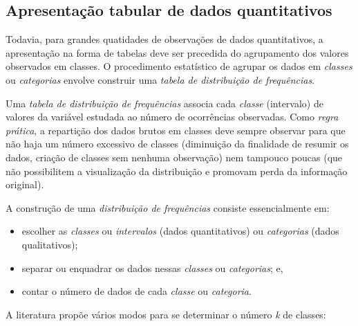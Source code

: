 \documentclass[
]{book}
\providecommand{\tightlist}{%
  \setlength{\itemsep}{0pt}\setlength{\parskip}{0pt}}
\begin{document}
\hypertarget{apresentauxe7uxe3o-tabular-de-dados-quantitativos}{%
\subsection{Apresentação tabular de dados quantitativos}\label{apresentauxe7uxe3o-tabular-de-dados-quantitativos}}

\hfill\break

Todavia, para grandes quatidades de observações de dados quantitativos, a apresentação na forma de tabelas deve ser precedida do agrupamento dos valores observados em classes. O procedimento estatístico de agrupar os dados em \emph{classes} ou \emph{categorias} envolve construir uma \emph{tabela de distribuição de frequências}.

\hfill\break

Uma \emph{tabela de distribuição de frequências} associa cada \emph{classe} (intervalo) de valores da variável estudada ao número de ocorrências observadas. Como \emph{regra prática}, a repartição dos dados brutos em classes deve sempre observar para que não haja um número excessivo de classes (diminuição da finalidade de resumir os dados, criação de classes sem nenhuma observação) nem tampouco poucas (que não possibilitem a visualização da distribuição e promovam perda da informação original).

\hfill\break

A construção de uma \emph{distribuição de frequências} consiste essencialmente em:

\hfill\break

\begin{itemize}
\tightlist
\item
  escolher as \emph{classes} ou \emph{intervalos} (dados quantitativos) ou \emph{categorias} (dados qualitativos);
\item
  separar ou enquadrar os dados nessas \emph{classes} ou \emph{categorias}; e,
\item
  contar o número de dados de cada \emph{classe} ou \emph{categoria}.
\end{itemize}

\hfill\break

A literatura propõe vários modos para se determinar o número \emph{k} de classes:

\hfill\break
\end{document}
